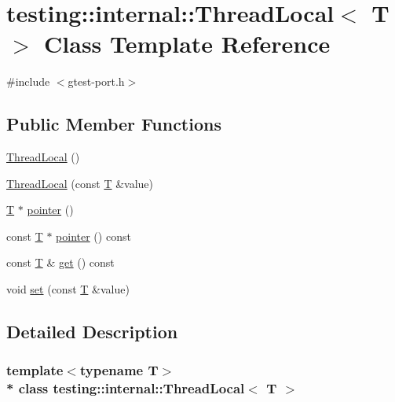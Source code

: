 \hypertarget{classtesting_1_1internal_1_1_thread_local}{}\section{testing\+:\+:internal\+:\+:Thread\+Local$<$ T $>$ Class Template Reference}
\label{classtesting_1_1internal_1_1_thread_local}


{\ttfamily \#include $<$gtest-\/port.\+h$>$}

\subsection*{Public Member Functions}
\begin{DoxyCompactItemize}
\item 
\hyperlink{classtesting_1_1internal_1_1_thread_local_a106f3a3ad15d08f95f9887105d2a1af5}{Thread\+Local} ()
\item 
\hyperlink{classtesting_1_1internal_1_1_thread_local_a85610bdfdbc93a4c56215e0aad7da870}{Thread\+Local} (const \hyperlink{functions__7_8js_adf1f3edb9115acb0a1e04209b7a9937b}{T} \&value)
\item 
\hyperlink{functions__7_8js_adf1f3edb9115acb0a1e04209b7a9937b}{T} $\ast$ \hyperlink{classtesting_1_1internal_1_1_thread_local_a882f57fed4b074de83693c0c0fe62858}{pointer} ()
\item 
const \hyperlink{functions__7_8js_adf1f3edb9115acb0a1e04209b7a9937b}{T} $\ast$ \hyperlink{classtesting_1_1internal_1_1_thread_local_af4b33c12fd2da7d43d8654feccca77f7}{pointer} () const 
\item 
const \hyperlink{functions__7_8js_adf1f3edb9115acb0a1e04209b7a9937b}{T} \& \hyperlink{classtesting_1_1internal_1_1_thread_local_a9cfa47ae6e9e8c19fe8782e2e9c1b13e}{get} () const 
\item 
void \hyperlink{classtesting_1_1internal_1_1_thread_local_ab5ebc7ba07426cef7167afa2a7707eb4}{set} (const \hyperlink{functions__7_8js_adf1f3edb9115acb0a1e04209b7a9937b}{T} \&value)
\end{DoxyCompactItemize}


\subsection{Detailed Description}
\subsubsection*{template$<$typename T$>$\\*
class testing\+::internal\+::\+Thread\+Local$<$ T $>$}




